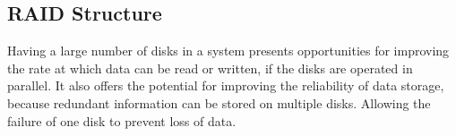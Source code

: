 \subsection{RAID Structure}\label{subsec:RAID_Structure}
Having a large number of disks in a system presents opportunities for improving the rate at which data can be read or written, if the disks are operated in parallel.
It also offers the potential for improving the reliability of data storage, because redundant information can be stored on multiple disks.
Allowing the failure of one disk to prevent loss of data.


